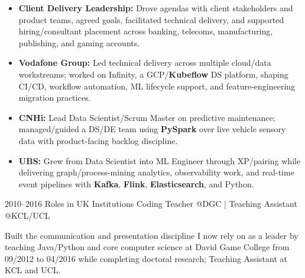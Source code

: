 \documentclass[]{../../friggeri-cv}
\begin{document}
\begin{entrylist}
{{        }
        \begin{itemize}[leftmargin=1.1em]
                                \item \footnotesize\textbf{Client Delivery Leadership:} Drove agendas with client stakeholders and product teams, agreed goals, facilitated technical delivery, and supported hiring/consultant placement across banking, telecoms, manufacturing, publishing, and gaming accounts.
                                \item \footnotesize\textbf{Vodafone Group:} Led technical delivery across multiple cloud/data workstreams; worked on Infinity, a GCP/\textbf{Kubeflow} DS platform, shaping CI/CD, workflow automation, ML lifecycle support, and feature-engineering migration practices.
                            \item \footnotesize\textbf{CNHi:} Lead Data Scientist/Scrum Master on predictive maintenance; managed/guided a DS/DE team using \textbf{PySpark} over live vehicle sensory data with product-facing backlog discipline.
                        \item \footnotesize\textbf{UBS:} Grew from Data Scientist into ML Engineer through XP/pairing while delivering graph/process-mining analytics, observability work, and real-time event pipelines with \textbf{Kafka}, \textbf{Flink}, \textbf{Elasticsearch}, and Python.
            \end{itemize}
    }
    \entry
    {2010--2016}
    {Roles in UK Institutions}
    {\small Coding Teacher @DGC | Teaching Assistant @KCL/UCL}
    {
        {\small
        \setlength{\parindent}{0pt}
        \setlength{\leftskip}{0pt}
            Built the communication and presentation discipline I now rely on as a leader by teaching Java/Python and core computer science at David Game College from 09/2012 to 04/2016 while completing doctoral research; Teaching Assistant at KCL and UCL.

            }
        }
    \end{entrylist}
    \newpage
    \setlength{\parskip}{2pt}
    \setlength{\parsep}{0pt}
\end{document}
